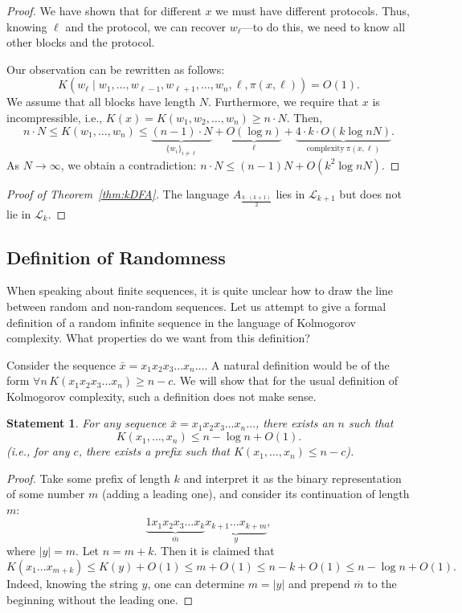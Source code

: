 \documentclass[12pt,sans]{article}
\theoremstyle{definition}
\theoremstyle{plain}
\newtheorem{statement}{Statement}[section]
\theoremstyle{remark}
\begin{document}
\begin{proof}
    We have shown that for different $x$ we must have different protocols. Thus, knowing $\ell$ and the protocol, we can recover $w_\ell$—to do this, we need to know all other blocks and the protocol.

    Our observation can be rewritten as follows:
    \[
    K(w_\ell \mid w_1,\dots,w_{\ell-1},w_{\ell+1},\dotsc,w_n,\ell,\pi(x,\ell)) = O(1).
    \]
    We assume that all blocks have length $N$. Furthermore, we require that $x$ is incompressible, i.e., $K(x) = K(w_1,w_2,\dotsc,w_n) \ge n \cdot N$.
    Then,
    \[
    n \cdot N \le K(w_1,\dotsc,w_n) \le
    \underbrace{(n-1) \cdot N}_{\{w_i\}_{i \neq \ell}} +
    \underbrace{O(\log n)}_{\ell} +
    \underbrace{4 \cdot k \cdot O(k \log n N)}_{\text{complexity}\ \pi(x,\ell)}.
    \]
    As $N \to \infty$, we obtain a contradiction: $n \cdot N \le (n-1)N + O(k^2 \log n N)$.
\end{proof}

\begin{proof}[Proof of Theorem~\ref{thm:kDFA}]
    The language $A_{\frac{k \cdot (k + 1)}{2}}$ lies in $\mathcal{L}_{k+1}$ but does not lie in $\mathcal{L}_k$.
\end{proof}


\subsection{Definition of Randomness}
When speaking about finite sequences, it is quite unclear how to draw the line between random and non-random sequences. Let us attempt to give a formal definition of a random infinite sequence in the language of Kolmogorov complexity. What properties do we want from this definition?

Consider the sequence $\bar{x} = x_1 x_2 x_3 \dotso x_n \dotso$. A natural definition would be of the form $\forall n \, K(x_1 x_2 x_3 \dotso x_n) \ge n - c$. We will show that for the usual definition of Kolmogorov complexity, such a definition does not make sense.

\begin{statement}
    For any sequence $\bar{x} = x_1 x_2 x_3 \dotso x_n \dotso$, there exists an $n$ such that
    \[
    K(x_1, \dotsc, x_n) \le n - \log n + O(1).
    \]
    (i.e., for any $c$, there exists a prefix such that $K(x_1, \dotsc, x_n) \le n - c$).
\end{statement}
\begin{proof}
    Take some prefix of length $k$ and interpret it as the binary representation of some number $m$ (adding a leading one), and consider its continuation of length $m$:
    \[
    \underbrace{1 x_1 x_2 x_3 \dotso x_k}_{\overline{m}}
    \underbrace{x_{k+1} \dotso x_{k + m}}_y,
    \]
    where $|y| = m$. Let $n = m + k$. Then it is claimed that
    \[
    K(x_1 \dotso x_{m+k}) \le K(y) + O(1) \le m + O(1) \le n - k + O(1) \le n - \log n + O(1).
    \]
    Indeed, knowing the string $y$, one can determine $m = |y|$ and prepend $\overline{m}$ to the beginning without the leading one.
\end{proof}
\end{document}
